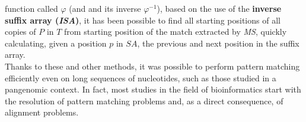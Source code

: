 \documentclass[a4paper,11pt, oneside]{article}
\begin{document}
function called $\varphi$ (and and its inverse $\varphi^{-1}$), based on the use
of the \textbf{inverse suffix array (\textit{ISA})}, it has been possible to
find all starting positions of all copies of $P$ in $T$ from starting position
of the match extracted by \textit{MS}, quickly calculating, given a position $p$
in $SA$, the previous and next position in the suffix array. \\
Thanks to these and other methods, it was possible to perform pattern matching
efficiently even on long sequences of nucleotides, such as those studied in
a pangenomic context. In fact, most studies in the field of bioinformatics start
with the resolution of pattern matching problems and, as a direct consequence,
of alignment problems. 
\end{document}
